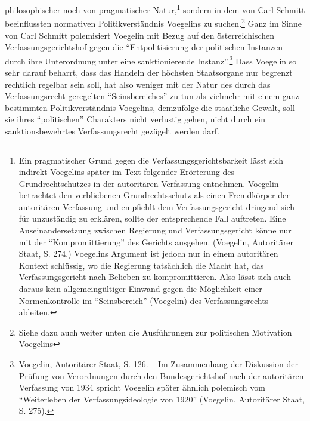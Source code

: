 \documentclass[12pt,a4paper,ngerman]{article}
\begin{document}
philosophischer noch von pragmatischer Natur,\footnote{Ein pragmatischer Grund
  gegen die Verfassungsgerichtsbarkeit lässt sich indirekt Voegelins später im
  Text folgender Erörterung des Grundrechtschutzes in der autoritären
  Verfassung entnehmen. Voegelin betrachtet den verbliebenen Grundrechtsschutz
  als einen Fremdkörper der autoritären Verfassung und empfiehlt dem
  Verfassungsgericht dringend sich für unzuständig zu erklären, sollte der
  entsprechende Fall auftreten.  Eine Auseinandersetzung zwischen Regierung
  und Verfassungsgericht könne nur mit der "`Kompromittierung"' des Gerichts
  ausgehen. (Voegelin, Autoritärer Staat, S. 274.) Voegelins Argument ist
  jedoch nur in einem autoritären Kontext schlüssig, wo die Regierung
  tatsächlich die Macht hat, das Verfassungsgericht nach Belieben zu
  kompromittieren. Also lässt sich auch daraus kein allgemeingültiger Einwand
  gegen die Möglichkeit einer Normenkontrolle im "`Seinsbereich"' (Voegelin)
  des Verfassungsrechts ableiten.}  sondern in dem von Carl Schmitt
beeinflussten normativen Politikverständnis Voegelins zu
suchen.\footnote{Siehe dazu auch weiter unten die Ausführungen zur politischen
  Motivation Voegelins} Ganz im Sinne von Carl Schmitt polemisiert Voegelin
mit Bezug auf den österreichischen Verfassungsgerichtshof gegen die
"`Entpolitisierung der politischen Instanzen durch ihre Unterordnung unter
eine sanktionierende Instanz"'.\footnote{Voegelin, Autoritärer Staat, S.  126.
  -- Im Zusammenhang der Diskussion der Prüfung von Verordnungen durch den
  Bundesgerichtshof nach der autoritären Verfassung von 1934 spricht Voegelin
  später ähnlich polemisch vom "`Weiterleben der Verfassungsideologie von
  1920"' (Voegelin, Autoritärer Staat, S.  275).} Dass Voegelin so sehr darauf
beharrt, dass das Handeln der höchsten Staatsorgane nur begrenzt rechtlich
regelbar sein soll, hat also weniger mit der Natur des durch das
Verfassungsrecht geregelten "`Seinsbereiches"' zu tun als vielmehr mit einem
ganz bestimmten Politikverständnis Voegelins, demzufolge die staatliche
Gewalt, soll sie ihres "`politischen"' Charakters nicht verlustig gehen, nicht
durch ein sanktionsbewehrtes Verfassungsrecht gezügelt werden darf.
\end{document}
